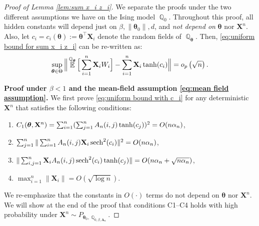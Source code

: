 \documentclass[preprint,reqno]{imsart}
\newcommand{\ttheta}{\boldsymbol{\theta}}
\newcommand{\an}{\alpha_{\mathnormal n}}
\DeclareMathOperator{\sech}{sech}
\DeclareMathOperator{\EE}{\mathbb{E}}
\DeclareMathOperator{\QQ}{\mathbb{Q}}
\newcommand{\A}{\mathbf{A}}
\newcommand{\X}{\mathbf{X}}
\DeclareMathOperator{\sumin}{\sum_{\mathnormal i=1}^{\mathnormal n}}
\DeclareMathOperator{\sumjn}{\sum_{\mathnormal j=1}^{\mathnormal n}}
\DeclareMathOperator{\sumij}{\sum_{\mathnormal{ i,j}=1}^{\mathnormal n}}
\begin{document}
\begin{proof}[Proof of Lemma \ref{lem:sum x_i z_i}] 
We separate the proofs under the two different assumptions we have on the Ising model $\QQ_0$. Throughout this proof, all hidden constants  will depend just on $\beta, \|\ttheta_0\|, d$, and \emph{not depend on} $\ttheta$ nor $\X^n$. Also, let $c_i = c_i(\ttheta):= \ttheta^\top \X_i$ denote the random fields of $\QQ_{\ttheta}$. Then, \eqref{eq:uniform bound for sum x_i z_i} can be re-written as:
\begin{equation}\label{eq:uniform bound with c_i}
        \sup_{\ttheta\in \Theta} \Big\lVert \EE^{\QQ_{\ttheta}} \Big[\sumin \X_i W_i \Big] - \sumin \X_i \tanh(c_i) \Big\rVert = o_p\left({\sqrt{n}} \right).
    \end{equation}

\vspace{2mm}
\noindent \textbf{Proof under $\beta <1$ and the mean-field assumption \eqref{eq:mean field assumption}.}
    We first prove \eqref{eq:uniform bound with c_i} for any deterministic $\X^n$ that satisfies the following conditions:
    \begin{enumerate}\setlength\itemsep{0.5em}
        \item[C1.] $C_1(\ttheta, \X^n) = \sumin (\sumjn A_n(i,j) \tanh(c_j))^2 = O( n \an)$,
        \item[C2.] $\sumjn \|\sumin A_n(i,j) \X_{i} \sech^2(c_i)\|^2 = O( n \an)$,
        \item[C3.] $\|\sumij \X_{i} A_n(i,j) \sech^2(c_i) \tanh(c_j)\| = O(n\an + \sqrt{n\an})$,
        \item[C4.] $\max_{i=1}^n \|\X_i\| = O(\sqrt{\log n})$.
    \end{enumerate}
   We re-emphasize that the constants in $O(\cdot)$ terms do not depend on $\ttheta$ nor $\X^n$. We will show at the end of the proof that conditions C1--C4 holds with high probability under $\X^n \sim P_{\ttheta_0, \QQ_{0,\beta,\A_n}}$.


\end{proof}
\end{document}

